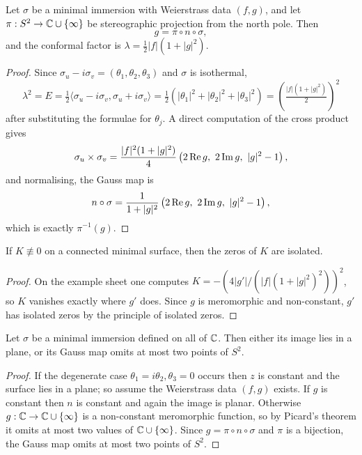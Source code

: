 \documentclass[a4paper]{scrartcl}
\begin{document}
\begin{proposition}
    Let $\sigma$ be a minimal immersion with Weierstrass data $(f,g)$, and let $\pi: S^2 \rightarrow \mathbb{C}\cup\{\infty\}$ be stereographic projection from the north pole. Then
    $$
    g = \pi \circ n \circ \sigma,
    $$
    and the conformal factor is $\lambda = \tfrac12|f|\left(1+|g|^2\right)$.
\end{proposition}
\begin{proof}
    Since $\sigma_u - i\sigma_v = (\theta_1,\theta_2,\theta_3)$ and $\sigma$ is isothermal,
    $$
    \lambda^2 = E = \tfrac12\langle \sigma_u - i\sigma_v, \sigma_u+i\sigma_v\rangle = \tfrac12\left(|\theta_1|^2+|\theta_2|^2+|\theta_3|^2\right) = \left(\tfrac{|f|(1+|g|^2)}{2}\right)^2
    $$
    after substituting the formulae for $\theta_j$. A direct computation of the cross product gives
    $$
    \sigma_u\times\sigma_v = \frac{|f|^2(1+|g|^2)}{4}\left(2\operatorname{Re} g,\ 2\operatorname{Im} g,\ |g|^2-1\right),
    $$
    and normalising, the Gauss map is
    $$
    n\circ\sigma = \frac{1}{1+|g|^2}\left(2\re g,\ 2\im g,\ |g|^2-1\right),
    $$
    which is exactly $\pi^{-1}(g)$.
\end{proof}

\begin{corollary}
    If $K \not\equiv 0$ on a connected minimal surface, then the zeros of $K$ are isolated.
\end{corollary}
\begin{proof}
    On the example sheet one computes $K = -\left(4|g'|/\left(|f|(1+|g|^2)^2\right)\right)^2$, so $K$ vanishes exactly where $g' $ does. Since $g$ is meromorphic and non-constant, $g'$ has isolated zeros by the principle of isolated zeros.
\end{proof}

\begin{theorem}
    Let $\sigma$ be a minimal immersion defined on all of $\mathbb{C}$. Then either its image lies in a plane, or its Gauss map omits at most two points of $S^2$.
\end{theorem}
\begin{proof}
    If the degenerate case $\theta_1 = i\theta_2, \theta_3 = 0$ occurs then $z$ is constant and the surface lies in a plane; so assume the Weierstrass data $(f,g)$ exists. If $g$ is constant then $n$ is constant and again the image is planar. Otherwise $g: \mathbb{C} \rightarrow \mathbb{C}\cup\{\infty\}$ is a non-constant meromorphic function, so by Picard's theorem it omits at most two values of $\mathbb{C}\cup\{\infty\}$. Since $g = \pi\circ n\circ\sigma$ and $\pi$ is a bijection, the Gauss map omits at most two points of $S^2$.
\end{proof}
\end{document}
